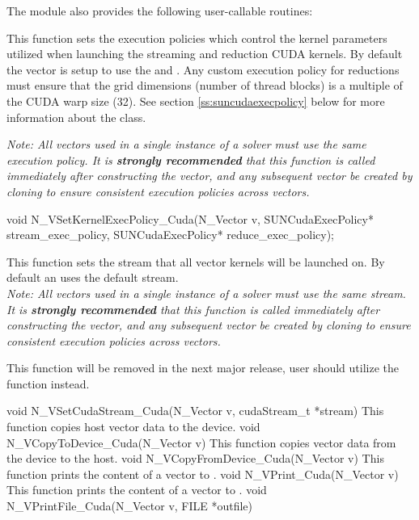 The module {\nveccuda} also provides the following user-callable routines:
{
  This function sets the execution policies which control the kernel parameters
  utilized when launching the streaming and reduction CUDA kernels. By default
  the vector is setup to use the  and
  . Any custom execution policy for reductions
  must ensure that the grid dimensions (number of thread blocks) is a multiple of
  the CUDA warp size (32). See section \ref{ss:suncudaexecpolicy} below for more
  information about the  class.

  \textit{Note: All vectors used in a single instance of a {\sundials} solver must
  use the same execution policy. It is \textbf{strongly recommended} that
  this function is called immediately after constructing the vector, and
  any subsequent vector be created by cloning to ensure consistent execution
  policies across vectors.}
}
{
  void N\_VSetKernelExecPolicy\_Cuda(N\_Vector v,
                                    SUNCudaExecPolicy* stream\_exec\_policy,
                                    SUNCudaExecPolicy* reduce\_exec\_policy);
}
{
  This function sets the {\cuda} stream that all vector kernels will be launched on.
  By default an {\nveccuda} uses the default {\cuda} stream.\\

  \textit{Note: All vectors used in a single instance of a {\sundials} solver must
  use the same {\cuda} stream. It is \textbf{strongly recommended} that
  this function is called immediately after constructing the vector, and
  any subsequent vector be created by cloning to ensure consistent execution
  policies across vectors.}

  \warn This function will be removed in the next major release,
  user should utilize the  function instead.
}
{
  void N\_VSetCudaStream\_Cuda(N\_Vector v, cudaStream\_t *stream)
}
{
 This function copies host vector data to the device.
}
{
 void N\_VCopyToDevice\_Cuda(N\_Vector v)
}
{
 This function copies vector data from the device to the host.
}
{
 void N\_VCopyFromDevice\_Cuda(N\_Vector v)
}
{
  This function prints the content of a {\cuda} vector to .
}
{
  void N\_VPrint\_Cuda(N\_Vector v)
}
{
  This function prints the content of a {\cuda} vector to .
}
{
  void N\_VPrintFile\_Cuda(N\_Vector v, FILE *outfile)
}

